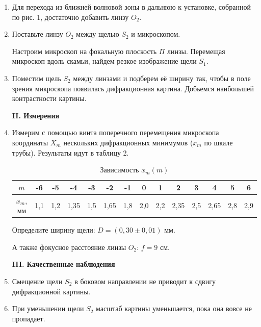\documentclass[a4paper,12pt]{article} %
\begin{document}
	\begin{enumerate}
		\item Для перехода из ближней волновой зоны в дальнюю к установке, собранной по рис. 1, достаточно добавить линзу $O_2$.
		
		\item Поставьте линзу $O_2$ между щелью $S_2$ и микроскопом.
		
		Настроим микроскоп на фокальную плоскость $\Pi$ линзы. Перемещая микроскоп вдоль скамьи, найдем резкое изображение щели $S_1$.
		
		\item Поместим щель $S_2$ между линзами и подберем её ширину так, чтобы в поле зрения микроскопа появилась дифракционная картина.
Добьемся наибольшей контрастности картины.
		
		\begin{center}
			\textbf{II. Измерения}
		\end{center}
	
		\item Измерим с помощью винта поперечного перемещения микроскопа координаты $X_m$ нескольких дифракционных минимумов ($x_m$ по шкале трубы). Результаты идут в таблицу 2.
		\begin{table}[h!]
			\centering
				\begin{tabular}{|c|c|c|c|c|c|c|c|c|c|c|c|c|c|}
					\hline
					$m$       & -6  & -5  & -4   & -3  & -2   & -1  & 0 & 1   & 2    & 3   & 4    & 5   & 6   \\ \hline
					$x_m$, мм & 1,1 & 1,2 & 1,35 & 1,5 & 1,65 & 1,8 & 2,0 & 2,2 & 2,35 & 2,5 & 2,65 & 2,8 & 2,9 \\ \hline
				\end{tabular}
		\caption{Зависимость $x_m(m)$}
		\end{table}
	
		Определите ширину щели: $D = (0,30 \pm 0,01)$ мм.
		
		А также фокусное расстояние линзы $O_2$: $f = 9$ см.
		
		
		
		\begin{center}
			\textbf{III. Качественные наблюдения}
		\end{center}
	
		\item Смещение щели $S_2$ в боковом направлении не приводит к сдвигу дифракционной картины.
		
		\item При уменьшении щели $S_2$ масштаб картины уменьшается, пока она вовсе не пропадает.
		

\end{enumerate}
\end{document}
